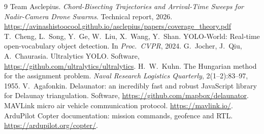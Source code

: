 \documentclass[11pt,a4paper]{article}
\begin{document}
\begin{thebibliography}{9}
 Team Asclepius. \emph{Chord-Bisecting Trajectories and Arrival-Time Sweeps for
  Nadir-Camera Drone Swarms}. Technical report, 2026.
  \url{https://avinashistoocool.github.io/asclepius/papers/coverage_theory.pdf}
 T.~Cheng, L.~Song, Y.~Ge, W.~Liu, X.~Wang, Y.~Shan. YOLO-World: Real-time
  open-vocabulary object detection. In \emph{Proc.\ CVPR}, 2024.
 G.~Jocher, J.~Qiu, A.~Chaurasia. Ultralytics YOLO. Software,
  \url{https://github.com/ultralytics/ultralytics}.
 H.~W.~Kuhn. The Hungarian method for the assignment problem. \emph{Naval Research
  Logistics Quarterly}, 2(1--2):83--97, 1955.
 V.~Agafonkin. Delaunator: an incredibly fast and robust JavaScript library for
  Delaunay triangulation. Software, \url{https://github.com/mapbox/delaunator}.
 MAVLink micro air vehicle communication protocol. \url{https://mavlink.io/}.
 ArduPilot Copter documentation: mission commands, geofence and RTL.
  \url{https://ardupilot.org/copter/}.
\end{thebibliography}
\end{document}
